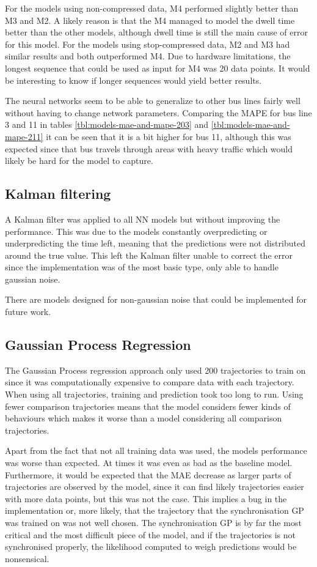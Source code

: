 For the models using non-compressed data, M4 performed slightly better than M3 and M2. A likely reason is that the M4 managed to model the dwell time better than the other models, although dwell time is still the main cause of error for this model. For the models using stop-compressed data, M2 and M3 had similar results and both outperformed M4. Due to hardware limitations, the longest sequence that could be used as input for M4 was 20 data points. It would be interesting to know if longer sequences would yield better results.

The neural networks seem to be able to generalize to other bus lines fairly well without having to change network parameters. Comparing the MAPE for bus line 3 and 11 in tables \ref{tbl:models-mae-and-mape-203} and \ref{tbl:models-mae-and-mape-211} it can be seen that it is a bit higher for bus 11, although this was expected since that bus travels through areas with heavy traffic which would likely be hard for the model to capture.

\subsection{Kalman filtering}
A Kalman filter was applied to all NN models but without improving the performance. This was due to the models constantly overpredicting or underpredicting the time left, meaning that the predictions were not distributed around the true value. This left the Kalman filter unable to correct the error since the implementation was of the most basic type, only able to handle gaussian noise. 

There are models designed for non-gaussian noise that could be implemented for future work.

\subsection{Gaussian Process Regression}
The Gaussian Process regression approach only used 200 trajectories to train on since it was computationally expensive to compare data with each trajectory. When using all trajectories, training and prediction took too long to run. Using fewer comparison trajectories means that the model considers fewer kinds of behaviours which makes it worse than a model considering all comparison trajectories.

Apart from the fact that not all training data was used, the models performance was worse than expected. At times it was even as bad as the baseline model. Furthermore, it would be expected that the MAE decrease as larger parts of trajectories are observed by the model, since it can find likely trajectories easier with more data points, but this was not the case. This implies a bug in the implementation or, more likely, that the trajectory that the synchronisation GP was trained on was not well chosen. The synchronisation GP is by far the most critical and the most difficult piece of the model, and if the trajectories is not synchronised properly, the likelihood computed to weigh predictions would be nonsensical. 

